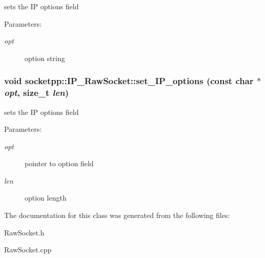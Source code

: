 sets the IP options field 

\begin{Desc}
\item[Parameters:]
\begin{description}
\item[{\em opt}]option string \end{description}
\end{Desc}
\hypertarget{classsocketpp_1_1IP__RawSocket_82c0b2c75d081bc84d8e60bf18199e65}{
\subsubsection[{set\_\-IP\_\-options}]{\setlength{\rightskip}{0pt plus 5cm}void socketpp::IP\_\-RawSocket::set\_\-IP\_\-options (const char $\ast$ {\em opt}, \/  size\_\-t {\em len})}}
\label{classsocketpp_1_1IP__RawSocket_82c0b2c75d081bc84d8e60bf18199e65}


sets the IP options field 

\begin{Desc}
\item[Parameters:]
\begin{description}
\item[{\em opt}]pointer to option field \item[{\em len}]option length \end{description}
\end{Desc}


The documentation for this class was generated from the following files:\begin{CompactItemize}
\item 
RawSocket.h\item 
RawSocket.cpp\end{CompactItemize}
